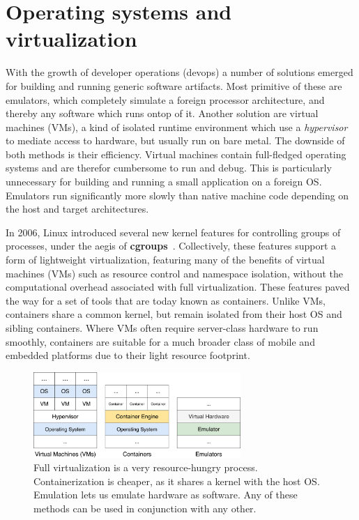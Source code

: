 \section{Operating systems and virtualization}\label{sec:os-and-virtualization}

With the growth of developer operations (devops) a number of solutions emerged for building and running generic software artifacts. Most primitive of these are emulators, which completely simulate a foreign processor architecture, and thereby any software which runs ontop of it. Another solution are virtual machines (VMs), a kind of isolated runtime environment which use a \textit{hypervisor} to mediate access to hardware, but usually run on bare metal. The downside of both methods is their efficiency. Virtual machines contain full-fledged operating systems and are therefor cumbersome to run and debug. This is particularly unnecessary for building and running a small application on a foreign OS. Emulators run significantly more slowly than native machine code depending on the host and target architectures.

In 2006, Linux introduced several new kernel features for controlling groups of processes, under the aegis of \textbf{cgroups}~\citep{menage2007adding}. Collectively, these features support a form of lightweight virtualization, featuring many of the benefits of virtual machines (VMs) such as resource control and namespace isolation, without the computational overhead associated with full virtualization. These features paved the way for a set of tools that are today known as containers. Unlike VMs, containers share a common kernel, but remain isolated from their host OS and sibling containers. Where VMs often require server-class hardware to run smoothly, containers are suitable for a much broader class of mobile and embedded platforms due to their light resource footprint.

\begin{figure}
    \centering
    \includegraphics[width=0.70\textwidth]{../figures/vms_containers_emulators.png}
    \caption{Full virtualization is a very resource-hungry process. Containerization is cheaper, as it shares a kernel with the host OS. Emulation lets us emulate hardware as software. Any of these methods can be used in conjunction with any other.\vspace{-10pt}}
    \label{fig:vms_containers_emulators}
\end{figure}

